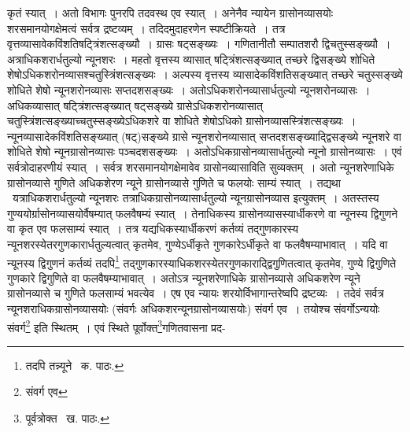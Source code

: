 \documentclass[11pt, openany]{book}
\begin{document}
\noindent कृतं स्यात्~। अतो विभागः पुनरपि तदवस्थ एव स्यात्~। अनेनैव न्यायेन ग्रासोनव्यासयोः शरसमानयोगक्षेमत्वं सर्वत्र द्रष्टव्यम्~। तदिदमुदाहरणेन स्पष्टीक्रियते~। तत्र वृत्तव्यासावेकविंशतिषट्त्रिंशत्सङ्ख्यौ~। ग्रासः षट्सङ्ख्यः~। गणितानीतौ सम्पातशरौ द्विचतुस्सङ्ख्यौ~। अत्राधिकशरार्धतुल्यो न्यूनशरः~। महतो वृत्तस्य व्यासात् षट्त्रिंशत्सङ्ख्यात् तच्छरे द्विसङ्ख्ये शोधिते शेषोऽधिकशरोनव्यासश्चतुस्त्रिंशत्सङ्ख्यः~। अल्पस्य वृत्तस्य व्यासादेकविंशतिसङ्ख्यात् तच्छरे चतुस्सङ्ख्ये शोधिते शेषो न्यूनशरोनव्यासः सप्तदशसङ्ख्यः~। अतोऽधिकशरोनव्यासार्धतुल्यो न्यूनशरोनव्यासः~। अधिकव्यासात् षट्त्रिंशत्सङ्ख्यात् षट्सङ्ख्ये ग्रासेऽधिकशरोनव्यासात् चतुस्त्रिंशत्सङ्ख्याच्चतुस्सङ्ख्येऽधिकशरे वा शोधिते शेषोऽधिको ग्रासोनव्यासस्त्रिंशत्सङ्ख्यः~। न्यूनव्यासादेकविंशतिसङ्ख्यात् (षट्)सङ्ख्ये ग्रासे न्यूनशरोनव्यासात् सप्तदशसङ्ख्याद्द्विसङ्ख्ये न्यूनशरे वा शोधिते शेषो न्यूनग्रासोनव्यासः पञ्चदशसङ्ख्यः~। अतोऽधिकग्रासोनव्यासार्धतुल्यो न्यूनो ग्रासोनव्यासः~। एवं सर्वत्रोदाहरणीयं स्यात्~। सर्वत्र शरसमानयोगक्षेमावेव ग्रासोनव्यासाविति सुव्यक्तम्~। अतो न्यूनशरेणाधिके ग्रासोनव्यासे गुणिते अधिकशेरण न्यूने ग्रासोनव्यासे गुणिते च फलयोः साम्यं स्यात्~। तद्यथा \textendash\ यत्राधिकशरार्धतुल्यो न्यूनशरः तत्राधिकग्रासोनव्यासार्धतुल्यो न्यूनग्रासोनव्यास इत्युक्तम्~। अतस्तस्य गुण्ययोर्ग्रासोनव्यासयोर्वैषम्यात् फलवैषम्यं स्यात्~। तेनाधिकस्य ग्रासोनव्यासस्यार्धीकरणे वा न्यूनस्य द्विगुणने वा कृत एव फलसाम्यं स्यात्~। तत्र यद्यधिकस्यार्धीकरणं कर्तव्यं तद्गुणकारस्य न्यूनशरस्येतरगुणकारार्धतुल्यत्वात् कृतमेव, गुण्येऽर्धीकृते गुणकारेऽर्धीकृते वा फलवैषम्याभावात्~। यदि वा न्यूनस्य द्विगुणनं कर्तव्यं तदपि\renewcommand{\thefootnote}{१}\footnote{तदपि तन्न्यूने \textendash\ क. पाठः.} तद्गुणकारस्याधिकशरस्येतरगुणकाराद्द्विगुणितत्वात् कृतमेव, गुण्ये द्विगुणिते गुणकारे द्विगुणिते वा फलवैषम्याभावात्~। अतोऽत्र न्यूनशरेणाधिके ग्रासोनव्यासे अधिकशरेण न्यूने ग्रासोनव्यासे च गुणिते फलसाम्यं भवत्येव~। एष एव न्यायः शरयोर्विभागान्तरेष्वपि द्रष्टव्यः~। तदेवं सर्वत्र न्यूनशराधिकग्रासोनव्यासयोः (संवर्गः अधिकशरन्यूनग्रासोनव्यासयोः) संवर्ग एव~। तयोश्च संवर्गोऽन्ययोः संवर्ग\renewcommand{\thefootnote}{२}\footnote{संवर्ग एव} इति स्थितम्~। एवं स्थिते पूर्वोक्त\renewcommand{\thefootnote}{३}\footnote{पूर्वत्रोक्त \textendash\ ख. पाठः.}गणितवासना प्रद-

\newpage
\end{document}
